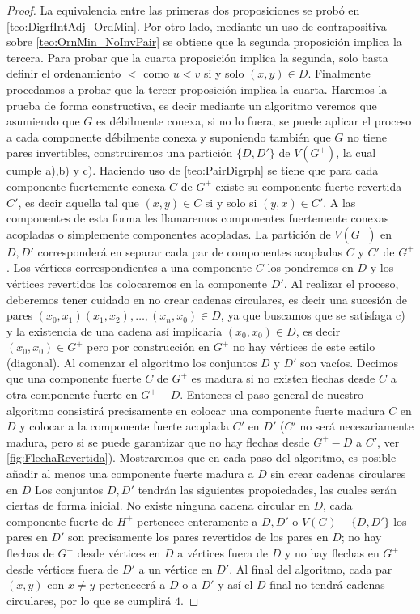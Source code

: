 \begin{teorema}
\begin{proof}
    La equivalencia entre las primeras dos proposiciones se probó en \cref{teo:DigrfIntAdj_OrdMin}.
    Por otro lado, mediante un uso de contrapositiva sobre \cref{teo:OrnMin_NoInvPair} se obtiene que la segunda proposición implica la tercera. 
    {\color{malva}Para probar que la cuarta proposición implica la segunda, solo basta definir el ordenamiento $<$ como $u<v$ si y solo $(x,y) \in D$. }
    Finalmente procedamos a probar que la tercer proposición implica la cuarta. Haremos la prueba de forma constructiva, es decir mediante un algoritmo veremos que asumiendo que $G$ es débilmente conexa, si no lo fuera, se puede aplicar el proceso a cada componente débilmente conexa y  suponiendo también que $G$ no tiene pares invertibles, construiremos una partición $\{D,D'\}$ de $V(G^+)$, la cual cumple a),b) y c). 
    Haciendo uso de \cref{teo:PairDigrph} se tiene que para cada componente fuertemente conexa $C$ de $G^+$ existe su componente fuerte revertida $C'$, es decir aquella tal que $(x,y)\in C $ si y solo si $(y,x)\in C'$. A las componentes de esta forma les llamaremos componentes fuertemente conexas acopladas o simplemente componentes acopladas.
    La partición de $V(G^+)$ en $D,D'$ corresponderá en separar cada par de componentes acopladas $C$ y $C'$ de $G^+$. Los vértices correspondientes a una componente $C$ los pondremos en $D$ y los vértices revertidos los colocaremos en la componente $D'$. Al realizar el proceso, deberemos tener cuidado en no crear cadenas circulares, es decir una sucesión de pares $(x_0,x_1)(x_1,x_2),\dots, (x_n,x_0)\in D$, ya que buscamos que se satisfaga c) y la existencia de una cadena así implicaría $(x_0,x_0)\in D$, es decir $(x_0,x_0)\in G^+$ pero por construcción en $G^+$ no hay vértices de este estilo (diagonal). 
    Al comenzar el algoritmo los conjuntos $D$ y $D'$ son vacíos. Decimos que una componente fuerte $C$ de $G^+$ es madura si no existen flechas desde $C$ a otra componente fuerte en $G^+ -D$. Entonces el paso general de nuestro algoritmo consistirá precisamente en colocar una componente fuerte madura $C$ en $D$ y colocar a la componente fuerte acoplada $C' $ en $D'$ ($C'$ no será necesariamente madura, pero si se puede garantizar que no hay flechas desde $G^+ -D$ a $C'$, ver \cref{fig:FlechaRevertida}). 
    Mostraremos que en cada paso del algoritmo, es posible añadir al menos una componente fuerte madura a $D$ sin crear cadenas circulares en $D$
    Los conjuntos $D,D'$ tendrán las siguientes propoiedades, las cuales serán ciertas de forma inicial. No existe ninguna cadena circular en $D$, cada componente fuerte de $H^+$ pertenece enteramente a $D, D'$ o $V(G)-\{D,D' \} $ los pares en $D'$ son precisamente los pares revertidos de los pares en $D$; no hay flechas de $G^+$ desde vértices en $D$ a vértices fuera de $D$ y no hay flechas en $G^+$ desde vértices fuera de $D'$ a un vértice en $D'$. Al final del algoritmo, cada par $(x,y)$ con $x\neq y$ pertenecerá a $D$ o a $D'$ y así el $D$ final no tendrá cadenas circulares, por lo que se cumplirá $4$.

\end{proof}
\end{teorema}
